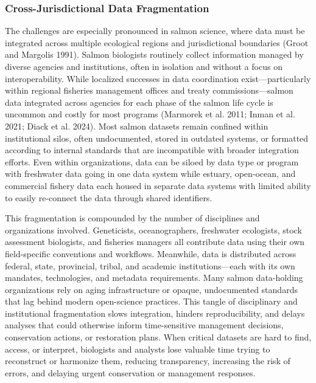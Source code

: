 \documentclass[
  letterpaper,
  DIV=11,
  numbers=noendperiod]{scrartcl}
\begin{document}
\subsubsection{Cross-Jurisdictional Data
Fragmentation}\label{cross-jurisdictional-data-fragmentation}

The challenges are especially pronounced in salmon science, where data
must be integrated across multiple ecological regions and jurisdictional
boundaries (Groot and Margolis 1991). Salmon biologists routinely
collect information managed by diverse agencies and institutions, often
in isolation and without a focus on interoperability. While localized
successes in data coordination exist---particularly within regional
fisheries management offices and treaty commissions---salmon data
integrated across agencies for each phase of the salmon life cycle is
uncommon and costly for most programs (Marmorek et al. 2011; Inman et
al. 2021; Diack et al. 2024). Most salmon datasets remain confined
within institutional silos, often undocumented, stored in outdated
systems, or formatted according to internal standards that are
incompatible with broader integration efforts. Even within
organizations, data can be siloed by data type or program with
freshwater data going in one data system while estuary, open-ocean, and
commercial fishery data each housed in separate data systems with
limited ability to easily re-connect the data through shared
identifiers.

This fragmentation is compounded by the number of disciplines and
organizations involved. Geneticists, oceanographers, freshwater
ecologists, stock assessment biologists, and fisheries managers all
contribute data using their own field-specific conventions and
workflows. Meanwhile, data is distributed across federal, state,
provincial, tribal, and academic institutions---each with its own
mandates, technologies, and metadata requirements. Many salmon
data-holding organizations rely on aging infrastructure or opaque,
undocumented standards that lag behind modern open-science practices.
This tangle of disciplinary and institutional fragmentation slows
integration, hinders reproducibility, and delays analyses that could
otherwise inform time-sensitive management decisions, conservation
actions, or restoration plans. When critical datasets are hard to find,
access, or interpret, biologists and analysts lose valuable time trying
to reconstruct or harmonize them, reducing transparency, increasing the
risk of errors, and delaying urgent conservation or management
responses.
\end{document}
